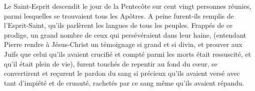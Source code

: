 Le Saint-Esprit descendit le jour de la Pentecôte sur cent vingt personnes réunies, parmi lesquelles se trouvaient tous les Apôtres. A peine furent-ils remplis de l’Esprit-Saint, qu’ils parlèrent les langues de tous les peuples. Frappés de ce prodige, un grand nombre de ceux qui persévéraient dans leur haine, (entendant Pierre rendre à Jésus-Christ un témoignage si grand et si divin, et prouver aux Juifs que celui qu’ils avaient crucifié et compté parmi les morts était ressuscité, et qu’il était plein de vie), furent touchés de repentir au fond du cœur, se convertirent et reçurent le pardon du sang si précieux qu’ils avaient versé avec tant d’impiété et de cruauté, rachetés par ce sang même qu’ils avaient répandu.